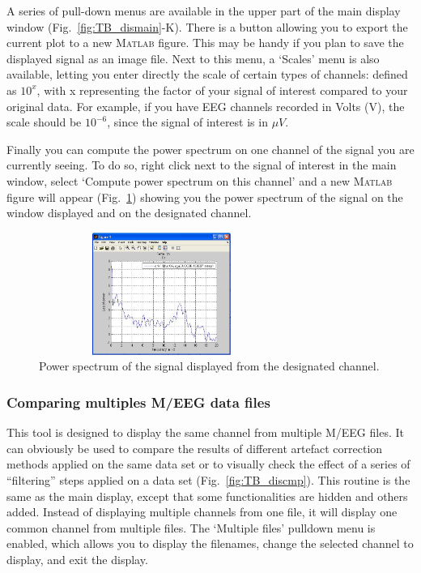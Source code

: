 \documentclass[a4paper,titlepage]{article}
\newcommand{\matlab}{\textsc{Matlab }}
\begin{document}
A series of pull-down menus are available in the upper part of the main display window (Fig.~\ref{fig:TB_dismain}-K). There is a button allowing you to export the current plot to a new \matlab figure. This may be handy if you plan to save the displayed signal as an image file. Next to this menu, a `Scales' menu is also available, letting you enter directly the scale of certain types of channels: defined as $10^x$, with x representing the factor of your signal of interest compared to your original data. For example, if you have EEG channels recorded in Volts (V), the scale should be $10^{-6}$, since the signal of interest is in $\mu V$.

Finally you can compute the power spectrum on one channel of the signal you are currently seeing. To do so, right click next to the signal of interest in the main window, select `Compute power spectrum on this channel' and a new \matlab figure will appear (Fig.~\ref{fig:TB_dismainpwr}) showing you the power spectrum of the signal on the window displayed and on the designated channel.
\begin{figure}[ht]
	\centering
		\includegraphics[width=8cm,height=4cm]{images/FIG4_dis_pwr.jpg}
	\caption{Power spectrum of the signal displayed from the designated channel.
	\label{fig:TB_dismainpwr}}
\end{figure}


\subsubsection{Comparing multiples M/EEG data files}
This tool is designed to display the same channel from multiple M/EEG files. It can obviously be used to compare the results of different artefact correction methods applied on the same data set or to visually check the effect of a series of ``filtering'' steps applied on a data set (Fig.~\ref{fig:TB_discmp}). This routine is the same as the main display, except that some functionalities are hidden and others added. Instead of displaying multiple channels from one file, it will display one common channel from multiple files. The `Multiple files' pulldown menu is enabled, which allows you to display the filenames, change the selected channel to display, and exit the display. 
\end{document}
